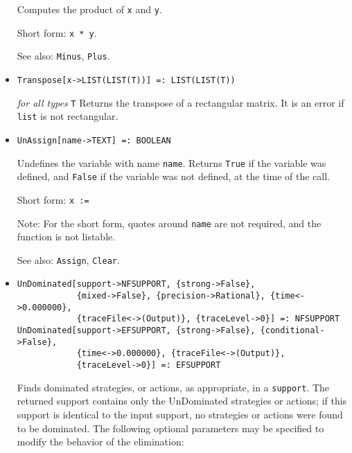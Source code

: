 \begin{itemize}
\bd
Computes the product of \verb+x+ and \verb+y+.
\item [Short form:] \verb+x * y+.
\item [See also:] \verb+Minus+, \verb+Plus+.
\ed

\item{}
\protect \large \begin{verbatim} 
Transpose[x->LIST(LIST(T))] =: LIST(LIST(T)) 
\end{verbatim}\normalsize

{\it for all types} {\tt T}
\bd
Returns the transpose of a rectangular matrix.  It is an error if \verb+list+
is not rectangular.
\ed



\item{}
\protect \large \begin{verbatim}
UnAssign[name->TEXT] =: BOOLEAN
\end{verbatim}\normalsize

\bd
Undefines the variable with name \verb+name+.  Returns 
\verb+True+ if the variable was defined, and \verb+False+ if the
variable was not defined, at the time of the call.
\item [Short form:] \verb+x := +
\item [Note:] For the short form, quotes around \verb+name+ are not
required, and the function is not listable.
\item [See also:] \verb+Assign+, \verb+Clear+.
\ed

\item{}
\protect \large \begin{verbatim}
UnDominated[support->NFSUPPORT, {strong->False}, 
            {mixed->False}, {precision->Rational}, {time<->0.000000}, 
            {traceFile<->(Output)}, {traceLevel->0}] =: NFSUPPORT 
UnDominated[support->EFSUPPORT, {strong->False}, {conditional->False}, 
            {time<->0.000000}, {traceFile<->(Output)}, 
            {traceLevel->0}] =: EFSUPPORT 
\end{verbatim}\normalsize

\bd
Finds dominated strategies, or actions, as appropriate, in a 
\verb+support+.  The returned support contains only the UnDominated
strategies or actions; if this support is identical to the input support,
no strategies or actions were found to be dominated.  The following
optional parameters may be specified to modify the behavior of
the elimination:


\end{itemize}
